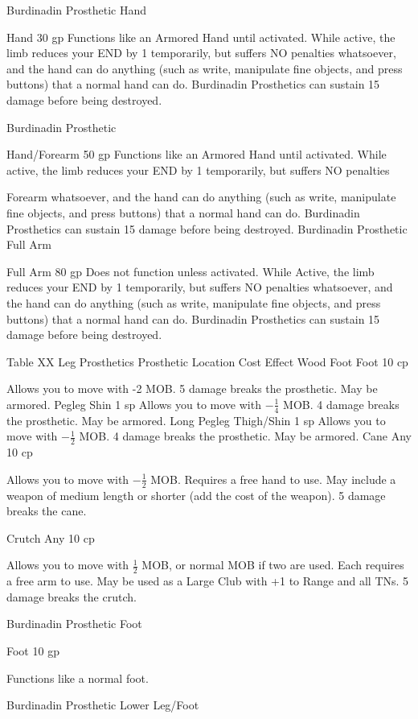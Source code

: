 \documentclass[oneside,11pt,english]{book}
\begin{document}
Burdinadin 
Prosthetic 
Hand 

Hand 30 gp Functions like an Armored Hand until activated. While active, the 
limb reduces your END by 1 temporarily, but suffers NO penalties 
whatsoever, and the hand can do anything (such as write, manipulate 
fine objects, and press buttons) that a normal hand can do. Burdinadin 
Prosthetics can sustain 15 damage before being destroyed. 

Burdinadin 
Prosthetic 

Hand/Forearm 50 gp Functions like an Armored Hand until activated. While active, the 
limb reduces your END by 1 temporarily, but suffers NO penalties 


Forearm whatsoever, and the hand can do anything (such as write, manipulate 
fine objects, and press buttons) that a normal hand can do. Burdinadin 
Prosthetics can sustain 15 damage before being destroyed. 
Burdinadin 
Prosthetic Full 
Arm 

Full Arm 80 gp Does not function unless activated. While Active, the limb reduces 
your END by 1 temporarily, but suffers NO penalties whatsoever, and 
the hand can do anything (such as write, manipulate fine objects, and 
press buttons) that a normal hand can do. Burdinadin Prosthetics can 
sustain 15 damage before being destroyed. 

 
Table XX Leg Prosthetics 
Prosthetic Location Cost Effect 
Wood Foot Foot 10 
cp 

Allows you to move with -2 MOB. 5 damage breaks the prosthetic. 
May be armored. 
Pegleg Shin 1 sp Allows you to move with $ -\frac{1}{4} $ MOB. 4 damage breaks the prosthetic. 
May be armored. 
Long Pegleg Thigh/Shin 1 sp Allows you to move with $ -\frac{1}{2} $ MOB. 4 damage breaks the prosthetic. 
May be armored. 
Cane Any 10 
cp 

Allows you to move with $ -\frac{1}{2} $ MOB. Requires a free hand to use. May 
include a weapon of medium length or shorter (add the cost of the 
weapon). 5 damage breaks the cane. 

Crutch Any 10 
cp 

Allows you to move with $ \frac{1}{2} $ MOB, or normal MOB if two are used. 
Each requires a free arm to use. May be used as a Large Club with +1 to 
Range and all TNs. 5 damage breaks the crutch. 

Burdinadin 
Prosthetic Foot 

Foot 10 
gp 

Functions like a normal foot. 

Burdinadin 
Prosthetic 
Lower Leg/Foot 
\end{document}
